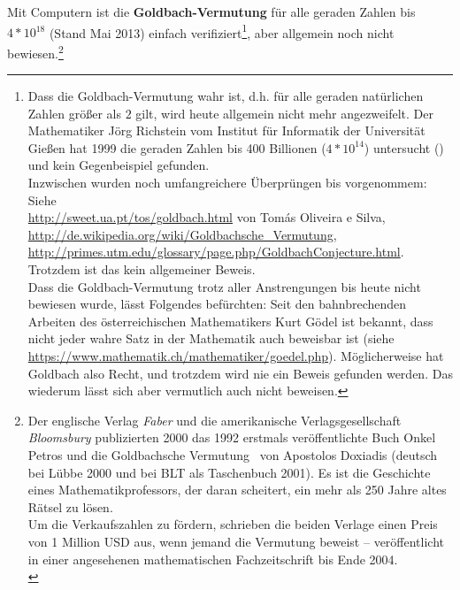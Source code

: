\begin{refsegment}
 Mit Computern ist die \textbf{Goldbach-Vermutung}
     für alle geraden Zahlen bis $4*10^{18}$ (Stand Mai 2013) einfach
     verifiziert\footnote{%
     Dass die Goldbach-Vermutung wahr ist, d.h. für alle geraden
     natürlichen Zahlen größer als $2$ gilt, wird heute allgemein nicht
     mehr angezweifelt. Der Mathematiker Jörg Richstein
     vom Institut für Informatik der Universität Gießen hat 1999 die geraden
     Zahlen bis 400 Billionen ($4*10^{14}$) untersucht (\cite{Richstein1999})
     und kein Gegenbeispiel gefunden.\\
     Inzwischen wurden noch umfangreichere Überprüngen bis vorgenommem: Siehe\\
     \url{http://sweet.ua.pt/tos/goldbach.html} von Tomás Oliveira e Silva, \\
     \url{http://de.wikipedia.org/wiki/Goldbachsche\_Vermutung},\\
     \url{http://primes.utm.edu/glossary/page.php/GoldbachConjecture.html}.\\
     Trotzdem ist das kein allgemeiner Beweis.\\
     Dass die Goldbach-Vermutung trotz aller Anstrengungen bis heute
     nicht bewiesen wurde, lässt Folgendes befürchten:
     Seit den bahnbrechenden Arbeiten des österreichischen Mathematikers
     Kurt Gödel ist bekannt, dass nicht jeder wahre
     Satz in der Mathematik auch beweisbar ist (siehe
     \url{https://www.mathematik.ch/mathematiker/goedel.php}).
     Möglicherweise hat Goldbach also Recht, und trotzdem wird nie ein
     Beweis gefunden werden. Das wiederum lässt sich aber vermutlich auch
     nicht beweisen.
     },   %
     aber allgemein noch nicht bewiesen.\footnote{%
     Der englische Verlag {\em Faber} und die amerikanische
     Verlagsgesellschaft {\em Bloomsbury} publizierten 2000 das 1992 erstmals
     veröffentlichte Buch \glqq Onkel Petros und die Goldbachsche
     Vermutung\grqq~ von Apostolos Doxiadis (deutsch bei
     Lübbe 2000 und bei BLT als Taschenbuch 2001). Es ist
     die Geschichte eines Mathematikprofessors, der daran scheitert, ein
     mehr als 250 Jahre altes Rätsel zu lösen.\\
     Um die Verkaufszahlen zu fördern, schrieben die beiden Verlage einen
     Preis von 1 Million USD aus, wenn jemand die Vermutung beweist --
     veröffentlicht in einer angesehenen mathematischen Fachzeitschrift
     bis Ende 2004.\\
}
\end{refsegment}
